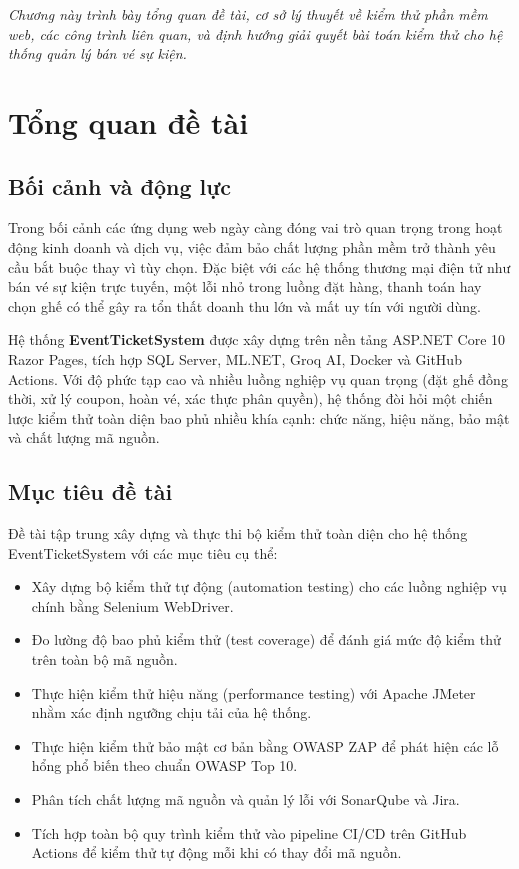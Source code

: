 \documentclass[../main.tex]{subfiles}
\begin{document}
\textit{Chương này trình bày tổng quan đề tài, cơ sở lý thuyết về kiểm thử phần mềm web, các công trình liên quan, và định hướng giải quyết bài toán kiểm thử cho hệ thống quản lý bán vé sự kiện.}

\section{Tổng quan đề tài}

\subsection{Bối cảnh và động lực}

Trong bối cảnh các ứng dụng web ngày càng đóng vai trò quan trọng trong hoạt động kinh doanh và dịch vụ, việc đảm bảo chất lượng phần mềm trở thành yêu cầu bắt buộc thay vì tùy chọn. Đặc biệt với các hệ thống thương mại điện tử như bán vé sự kiện trực tuyến, một lỗi nhỏ trong luồng đặt hàng, thanh toán hay chọn ghế có thể gây ra tổn thất doanh thu lớn và mất uy tín với người dùng.

Hệ thống \textbf{EventTicketSystem} được xây dựng trên nền tảng ASP.NET Core 10 Razor Pages, tích hợp SQL Server, ML.NET, Groq AI, Docker và GitHub Actions. Với độ phức tạp cao và nhiều luồng nghiệp vụ quan trọng (đặt ghế đồng thời, xử lý coupon, hoàn vé, xác thực phân quyền), hệ thống đòi hỏi một chiến lược kiểm thử toàn diện bao phủ nhiều khía cạnh: chức năng, hiệu năng, bảo mật và chất lượng mã nguồn.

\subsection{Mục tiêu đề tài}

Đề tài tập trung xây dựng và thực thi bộ kiểm thử toàn diện cho hệ thống EventTicketSystem với các mục tiêu cụ thể:

\begin{itemize}
    \item Xây dựng bộ kiểm thử tự động (automation testing) cho các luồng nghiệp vụ chính bằng Selenium WebDriver.
    \item Đo lường độ bao phủ kiểm thử (test coverage) để đánh giá mức độ kiểm thử trên toàn bộ mã nguồn.
    \item Thực hiện kiểm thử hiệu năng (performance testing) với Apache JMeter nhằm xác định ngưỡng chịu tải của hệ thống.
    \item Thực hiện kiểm thử bảo mật cơ bản bằng OWASP ZAP để phát hiện các lỗ hổng phổ biến theo chuẩn OWASP Top 10.
    \item Phân tích chất lượng mã nguồn và quản lý lỗi với SonarQube và Jira.
    \item Tích hợp toàn bộ quy trình kiểm thử vào pipeline CI/CD trên GitHub Actions để kiểm thử tự động mỗi khi có thay đổi mã nguồn.
\end{itemize}
\end{document}
